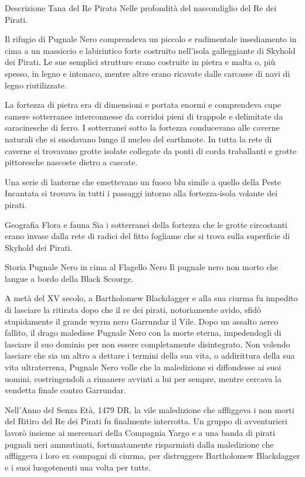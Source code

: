 \documentclass{article}
\begin{document}
Descrizione
Tana del Re Pirata
Nelle profondità del nascondiglio del Re dei Pirati.

Il rifugio di Pugnale Nero comprendeva un piccolo e rudimentale insediamento in cima a un massiccio e labirintico forte costruito nell'isola galleggiante di Skyhold dei Pirati. Le sue semplici strutture erano costruite in pietra e malta o, più spesso, in legno e intonaco, mentre altre erano ricavate dalle carcasse di navi di legno riutilizzate.

La fortezza di pietra era di dimensioni e portata enormi e comprendeva cupe camere sotterranee interconnesse da corridoi pieni di trappole e delimitate da saracinesche di ferro. I sotterranei sotto la fortezza conducevano alle caverne naturali che si snodavano lungo il nucleo del earthmote. In tutta la rete di caverne si trovavano grotte isolate collegate da ponti di corda traballanti e grotte pittoresche nascoste dietro a cascate.

Una serie di lanterne che emettevano un fuoco blu simile a quello della Peste Incantata si trovava in tutti i passaggi intorno alla fortezza-isola volante dei pirati.

Geografia
Flora e fauna
Sia i sotterranei della fortezza che le grotte circostanti erano invase dalla rete di radici del fitto fogliame che si trova sulla superficie di Skyhold dei Pirati.

Storia
Pugnale Nero in cima al Flagello Nero
Il pugnale nero non morto che langue a bordo della Black Scourge.

A metà del XV secolo, a Bartholomew Blackdagger e alla sua ciurma fu impedito di lasciare la ritirata dopo che il re dei pirati, notoriamente avido, sfidò stupidamente il grande wyrm nero Garrundar il Vile. Dopo un assalto aereo fallito, il drago maledisse Pugnale Nero con la morte eterna, impedendogli di lasciare il suo dominio per non essere completamente disintegrato. Non volendo lasciare che sia un altro a dettare i termini della sua vita, o addirittura della sua vita ultraterrena, Pugnale Nero volle che la maledizione si diffondesse ai suoi uomini, costringendoli a rimanere avvinti a lui per sempre, mentre cercava la vendetta finale contro Garrundar.

Nell'Anno del Senza Età, 1479 DR, la vile maledizione che affliggeva i non morti del Ritiro del Re dei Pirati fu finalmente interrotta. Un gruppo di avventurieri lavorò insieme ai mercenari della Compagnia Yargo e a una banda di pirati pugnali neri ammutinati, fortunatamente risparmiati dalla maledizione che affliggeva i loro ex compagni di ciurma, per distruggere Bartholomew Blackdagger e i suoi luogotenenti una volta per tutte.
\end{document}
